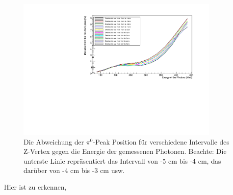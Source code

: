 \documentclass[a4paper,11pt,oneside,final,german,openbib,pdftex]{scrbook}
\begin{document}
{\begin{figure}[h!]
	\begin{center}
		\includegraphics[width=100mm]{20171804ZVertexDeviation}
		\caption{Die Abweichung der $\pi^0$-Peak Position für verschiedene Intervalle des Z-Vertex gegen die Energie der gemessenen Photonen. Beachte: Die unterste Linie repr\"asentiert das Intervall von -5 cm bis -4 cm, das dar\"uber von -4 cm bis -3 cm usw.}
		\label{fig:Z-Vertex-Multi-Graph}
	\end{center}
\end{figure}

Hier ist zu erkennen, 

}
\end{document}
